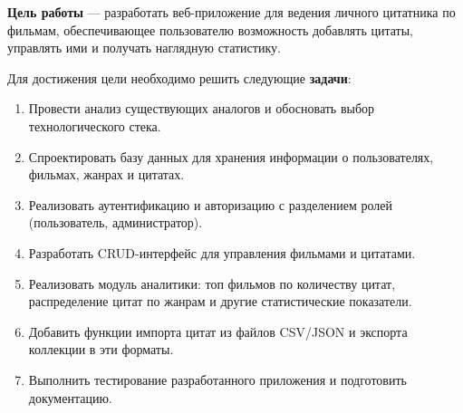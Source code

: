 \textbf{Цель работы} — разработать веб-приложение для ведения личного цитатника по фильмам, 
обеспечивающее пользователю возможность добавлять цитаты, управлять ими и получать наглядную 
статистику.

Для достижения цели необходимо решить следующие \textbf{задачи}:

\begin{enumerate}
    \item Провести анализ существующих аналогов и обосновать выбор технологического стека.
    \item Спроектировать базу данных для хранения информации о пользователях, фильмах, 
    жанрах и цитатах.
    \item Реализовать аутентификацию и авторизацию с разделением ролей (пользователь, 
    администратор).
    \item Разработать CRUD-интерфейс для управления фильмами и цитатами.
    \item Реализовать модуль аналитики: топ фильмов по количеству цитат, распределение 
    цитат по жанрам и другие статистические показатели.
    \item Добавить функции импорта цитат из файлов CSV/JSON и экспорта коллекции в эти 
    форматы.
    \item Выполнить тестирование разработанного приложения и подготовить документацию.
\end{enumerate}